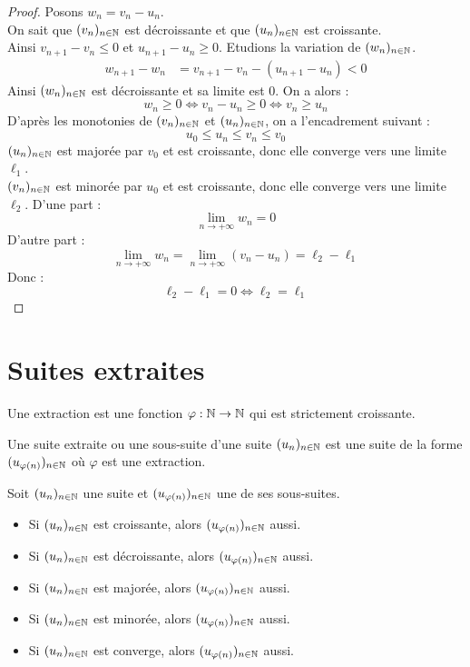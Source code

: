 \begin{proof}
    Posons $w_n = v_n - u_n$.
    \\ 
    On sait que $(v_n)_{n \in \mathbb{N}}$ est décroissante et que $(u_n)_{n \in \mathbb{N}}$ est croissante. 
    \\ 
    Ainsi $v_{n+1} - v_n \leq 0$ et $u_{n+1} - u_n \geq 0$.
    Etudions la variation de $(w_n)_{n \in \mathbb{N}}$.
    \begin{align*}
        w_{n+1} - w_n &= v_{n+1} - v_n - (u_{n+1} - u_n) < 0
    \end{align*}
    Ainsi $(w_n)_{n \in \mathbb{N}}$ est décroissante et sa limite est $0$.
    On a alors  :
    \[ w_n \geq 0 \iff  v_n - u_n \geq 0 \iff v_n \geq u_n \]
    D'après les monotonies de $(v_n)_{n \in \mathbb{N}}$ et $(u_n)_{n \in \mathbb{N}}$, on a l'encadrement suivant : 
    \[ u_0 \leq u_n \leq v_n \leq v_0 \]
    $(u_n)_{n \in \mathbb{N}}$ est majorée par $v_0$ et est croissante, donc elle converge vers une limite $\ell_1$.
    \\ 
    $(v_n)_{n \in \mathbb{N}}$ est minorée par $u_0$ et est croissante, donc elle converge vers une limite $\ell_2$.
    D'une part :
    \[ \lim_{n \to +\infty} w_n = 0 \]
    D'autre part :
    \[ \lim_{n \to +\infty} w_n = \lim_{n \to +\infty} (v_n - u_n) = \ell_2 - \ell_1 \]
    Donc :
    \[ \ell_2 - \ell_1 = 0 \iff \ell_2 = \ell_1 \]
\end{proof}

\section{Suites extraites}
\begin{definition}[Extraction]
    Une extraction est une fonction $\varphi : \mathbb{N} \to \mathbb{N}$ qui est strictement croissante.
\end{definition}

\begin{definition}
    Une suite extraite ou une sous-suite d'une suite $(u_n)_{n \in \mathbb{N}}$ est une suite de la forme $(u_{\varphi(n)})_{n \in \mathbb{N}}$ où $\varphi$ est une extraction.
\end{definition}

\begin{proposition}
    Soit $(u_n)_{n \in \mathbb{N}}$ une suite et $(u_{\varphi(n)})_{n \in \mathbb{N}}$ une de ses sous-suites.
    \begin{itemize}
        \item Si $(u_n)_{n \in \mathbb{N}}$ est croissante, alors $(u_{\varphi(n)})_{n \in \mathbb{N}}$ aussi.
        \item Si $(u_n)_{n \in \mathbb{N}}$ est décroissante, alors $(u_{\varphi(n)})_{n \in \mathbb{N}}$ aussi.
        \item Si $(u_n)_{n \in \mathbb{N}}$ est majorée, alors $(u_{\varphi(n)})_{n \in \mathbb{N}}$ aussi.
        \item Si $(u_n)_{n \in \mathbb{N}}$ est minorée, alors $(u_{\varphi(n)})_{n \in \mathbb{N}}$ aussi.
        \item Si $(u_n)_{n \in \mathbb{N}}$ est converge, alors $(u_{\varphi(n)})_{n \in \mathbb{N}}$ aussi.
    \end{itemize}
\end{proposition}

